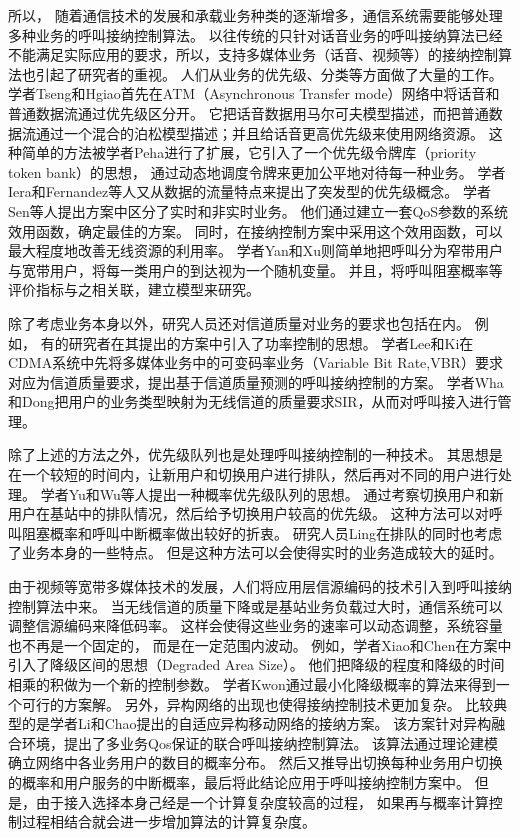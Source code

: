 所以，
随着通信技术的发展和承载业务种类的逐渐增多，通信系统需要能够处理多种业务的呼叫接纳控制算法。
以往传统的只针对话音业务的呼叫接纳算法已经不能满足实际应用的要求，所以，支持多媒体业务（话音、视频等）的接纳控制算法也引起了研究者的重视。
人们从业务的优先级、分类等方面做了大量的工作。
学者Tseng和Hgiao首先在ATM（Asynchronous Transfer mode）网络中将话音和普通数据流通过优先级区分开。
它把话音数据用马尔可夫模型描述，而把普通数据流通过一个混合的泊松模型描述；并且给话音更高优先级来使用网络资源\cite{Tseng:1991}。
这种简单的方法被学者Peha进行了扩展，它引入了一个优先级令牌库（priority token bank）的思想，
通过动态地调度令牌来更加公平地对待每一种业务\cite{Peha:1993}。
学者Iera和Fernandez等人又从数据的流量特点来提出了突发型的优先级概念\cite{Iera:1996}\cite{Fernandez:1997}。
学者Sen等人提出方案中区分了实时和非实时业务。
他们通过建立一套QoS参数的系统效用函数，确定最佳的方案。
同时，在接纳控制方案中采用这个效用函数，可以最大程度地改善无线资源的利用率\cite{Sen:1998}。
学者Yan和Xu则简单地把呼叫分为窄带用户与宽带用户，将每一类用户的到达视为一个随机变量。
并且，将呼叫阻塞概率等评价指标与之相关联，建立模型来研究\cite{Yan:2008}\cite{Xu:2007}。

除了考虑业务本身以外，研究人员还对信道质量对业务的要求也包括在内。 例如，
有的研究者在其提出的方案中引入了功率控制的思想\cite{LiuZhang:2002}\cite{ZhangFang:2006}。
学者Lee和Ki在CDMA系统中先将多媒体业务中的可变码率业务（Variable Bit
Rate,VBR）要求对应为信道质量要求，提出基于信道质量预测的呼叫接纳控制的方案\cite{Lee:2004}。
学者Wha和Dong把用户的业务类型映射为无线信道的质量要求SIR，从而对呼叫接入进行管理\cite{JeonJeong:2001}\cite{Wha:2002}。

除了上述的方法之外，优先级队列也是处理呼叫接纳控制的一种技术。
其思想是在一个较短的时间内，让新用户和切换用户进行排队，然后再对不同的用户进行处理。
学者Yu和Wu等人提出一种概率优先级队列的思想。
通过考察切换用户和新用户在基站中的排队情况，然后给予切换用户较高的优先级。
这种方法可以对呼叫阻塞概率和呼叫中断概率做出较好的折衷\cite{Yu:2006}。
研究人员Ling在排队的同时也考虑了业务本身的一些特点\cite{Ling:2009}。
但是这种方法可以会使得实时的业务造成较大的延时。


由于视频等宽带多媒体技术的发展，人们将应用层信源编码的技术引入到呼叫接纳控制算法中来。
当无线信道的质量下降或是基站业务负载过大时，通信系统可以调整信源编码来降低码率。
这样会使得这些业务的速率可以动态调整，系统容量也不再是一个固定的，
而是在一定范围内波动。
例如，学者Xiao和Chen在方案中引入了降级区间的思想（Degraded Area Size）\cite{XiaoChen:2000}。
他们把降级的程度和降级的时间相乘的积做为一个新的控制参数。
学者Kwon通过最小化降级概率的算法来得到一个可行的方案解\cite{KwonChoi:1999}。
另外，异构网络的出现也使得接纳控制技术更加复杂。
比较典型的是学者Li和Chao提出的自适应异构移动网络的接纳方案\cite{LiChao:2007}。
该方案针对异构融合环境，提出了多业务Qos保证的联合呼叫接纳控制算法。
该算法通过理论建模确立网络中各业务用户的数目的概率分布。
然后又推导出切换每种业务用户切换的概率和用户服务的中断概率，最后将此结论应用于呼叫接纳控制方案中。 
但是，由于接入选择本身己经是一个计算复杂度较高的过程，
如果再与概率计算控制过程相结合就会进一步增加算法的计算复杂度。


